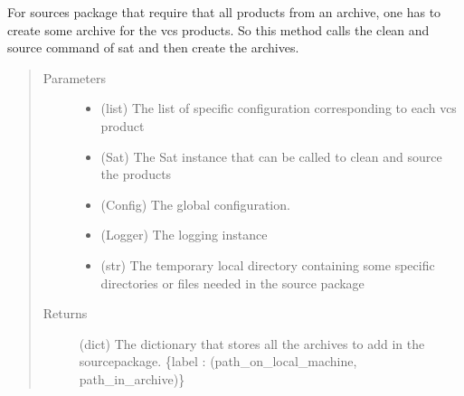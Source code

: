 \documentclass[a4paper,10pt,english]{sphinxmanual}
\begin{document}
\begin{fulllineitems}
\label{\detokenize{apidoc_commands/commands:commands.package.get_archives_vcs}}
For sources package that require that all products from an archive, 
one has to create some archive for the vcs products.
So this method calls the clean and source command of sat 
and then create the archives.
\begin{quote}\begin{description}
\item[{Parameters}] \leavevmode\begin{itemize}
\item {} 
 \textendash{} (list) 
The list of specific configuration corresponding to each vcs product

\item {} 
 \textendash{} (Sat) 
The Sat instance that can be called to clean and source the products

\item {} 
 \textendash{} (Config) The global configuration.

\item {} 
 \textendash{} (Logger) The logging instance

\item {} 
 \textendash{} (str) 
The temporary local directory containing some specific directories
or files needed in the source package

\end{itemize}

\item[{Returns}] \leavevmode
(dict) 
The dictionary that stores all the archives to add in the sourcepackage.
\{label : (path\_on\_local\_machine, path\_in\_archive)\}

\end{description}\end{quote}

\end{fulllineitems}

\end{document}
